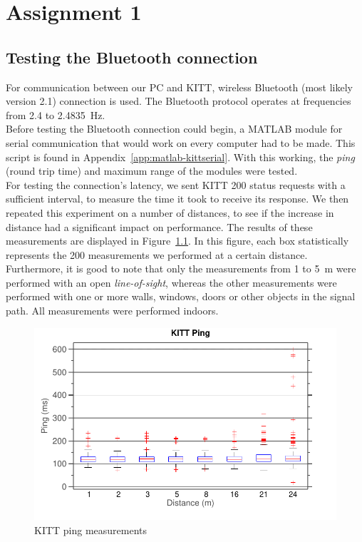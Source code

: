 \documentclass[11pt,titlepage]{report}
\begin{document}
\chapter{Assignment 1}
\section{Testing the Bluetooth connection}
For communication between our PC and KITT, wireless Bluetooth (most likely version 2.1) connection is used. The Bluetooth protocol operates at frequencies from \num{2.4} to \SI{2.4835}{Hz}. \cite{bluetooth-specs}
\\
Before testing the Bluetooth connection could begin, a MATLAB module for serial communication that would work on every computer had to be made. This script is found in Appendix~\ref{app:matlab-kittserial}. With this working, the \textit{ping} (round trip time) and maximum range of the modules were tested.
\\
For testing the connection's latency, we sent KITT \num{200} status requests with a sufficient interval, to measure the time it took to receive its response. We then repeated this experiment on a number of distances, to see if the increase in distance had a significant impact on performance. The results of these measurements are displayed in Figure~\ref{fig:ass1-ping}. In this figure, each box statistically represents the \num{200} measurements we performed at a certain distance. Furthermore, it is good to note that only the measurements from \num{1} to \SI{5}{m} were performed with an open \textit{line-of-sight}, whereas the other measurements were performed with one or more walls, windows, doors or other objects in the signal path. All measurements were performed indoors.

\begin{figure}[H]
	\centering
	\includegraphics[width=0.8\linewidth]{resource/kitt-ping-rc.pdf}
	\caption{KITT ping measurements}
	\label{fig:ass1-ping}
\end{figure}
\end{document}
